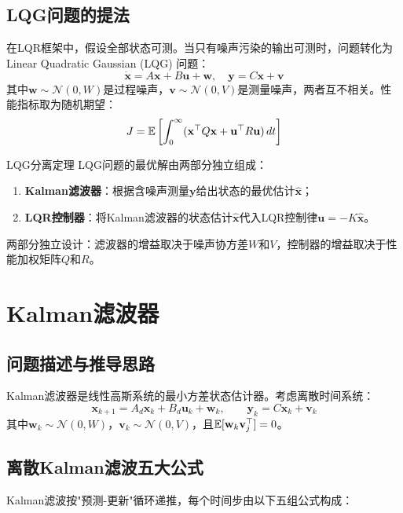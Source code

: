 \subsection{LQG问题的提法}

在LQR框架中，假设全部状态可测。当只有噪声污染的输出可测时，问题转化为Linear Quadratic Gaussian (LQG) 问题：
\[
\dot{\mathbf{x}} = A\mathbf{x} + B\mathbf{u} + \mathbf{w},\quad \mathbf{y} = C\mathbf{x} + \mathbf{v}
\]
其中$\mathbf{w} \sim \mathcal{N}(0, W)$是过程噪声，$\mathbf{v} \sim \mathcal{N}(0, V)$是测量噪声，两者互不相关。性能指标取为随机期望：
\[
J = \mathbb{E}\left[ \int_0^{\infty} (\mathbf{x}^{\top}Q\mathbf{x} + \mathbf{u}^{\top}R\mathbf{u})\,dt \right]
\]

\begin{myTheorem}{LQG分离定理}
LQG问题的最优解由两部分独立组成：
\begin{enumerate}
\item \textbf{Kalman滤波器}：根据含噪声测量$\mathbf{y}$给出状态的最优估计$\hat{\mathbf{x}}$；
\item \textbf{LQR控制器}：将Kalman滤波器的状态估计$\hat{\mathbf{x}}$代入LQR控制律$\mathbf{u} = -K\hat{\mathbf{x}}$。
\end{enumerate}
两部分独立设计：滤波器的增益取决于噪声协方差$W$和$V$，控制器的增益取决于性能加权矩阵$Q$和$R$。
\end{myTheorem}

\section{Kalman滤波器}

\subsection{问题描述与推导思路}

Kalman滤波器是线性高斯系统的最小方差状态估计器。考虑离散时间系统：
\[
\mathbf{x}_{k+1} = A_d\mathbf{x}_k + B_d\mathbf{u}_k + \mathbf{w}_k,\qquad
\mathbf{y}_k = C\mathbf{x}_k + \mathbf{v}_k
\]
其中$\mathbf{w}_k \sim \mathcal{N}(0, W)$，$\mathbf{v}_k \sim \mathcal{N}(0, V)$，且$\mathbb{E}[\mathbf{w}_k\mathbf{v}_j^{\top}] = 0$。

\subsection{离散Kalman滤波五大公式}

Kalman滤波按"预测-更新"循环递推，每个时间步由以下五组公式构成：

